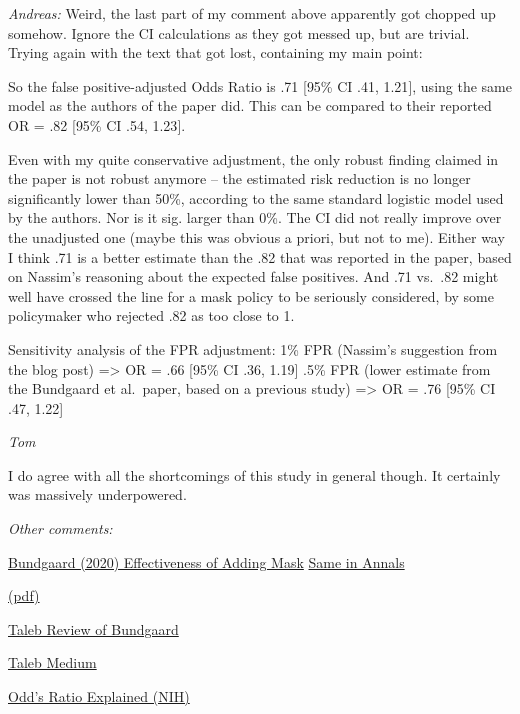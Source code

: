 \documentclass[
]{book}
\begin{document}
\emph{Andreas:}
Weird, the last part of my comment above apparently got chopped up somehow. Ignore the CI calculations as they got messed up, but are trivial. Trying again with the text that got lost, containing my main point:

So the false positive-adjusted Odds Ratio is .71 {[}95\% CI .41, 1.21{]}, using the same model as the authors of the paper did. This can be compared to their reported OR = .82 {[}95\% CI .54, 1.23{]}.

Even with my quite conservative adjustment, the only robust finding claimed in the paper is not robust anymore -- the estimated risk reduction is no longer significantly lower than 50\%, according to the same standard logistic model used by the authors. Nor is it sig. larger than 0\%. The CI did not really improve over the unadjusted one (maybe this was obvious a priori, but not to me). Either way I think .71 is a better estimate than the .82 that was reported in the paper, based on Nassim's reasoning about the expected false positives. And .71 vs.~.82 might well have crossed the line for a mask policy to be seriously considered, by some policymaker who rejected .82 as too close to 1.

Sensitivity analysis of the FPR adjustment:
1\% FPR (Nassim's suggestion from the blog post) =\textgreater{} OR = .66 {[}95\% CI .36, 1.19{]}
.5\% FPR (lower estimate from the Bundgaard et al.~paper, based on a previous study) =\textgreater{} OR = .76 {[}95\% CI .47, 1.22{]}

\emph{Tom}

I do agree with all the shortcomings of this study in general though. It certainly was massively underpowered.

\emph{Other comments:}

\href{https://pubmed.ncbi.nlm.nih.gov/33205991/}{Bundgaard (2020) Effectiveness of Adding Mask}
\href{https://www.acpjournals.org/doi/10.7326/M20-6817}{Same in Annals}

\href{pdf/Bundgaard_2020_Mask_Effectiveness_ref_Taleb.pdf}{(pdf)}

\href{https://fooledbyrandomnessdotcom.wordpress.com/2020/11/25/hypothesis-testing-in-the-presence-of-false-positives-the-flaws-in-the-danish-mask-study/}{Taleb Review of Bundgaard}

\href{https://medium.com/incerto/the-masks-masquerade-7de897b517b7}{Taleb Medium}

\href{https://www.ncbi.nlm.nih.gov/pmc/articles/PMC2938757/}{Odd's Ratio Explained (NIH)}
\end{document}
